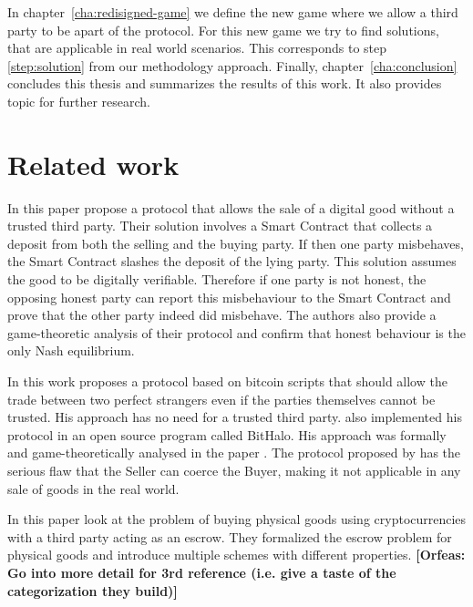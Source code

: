 \documentclass{cacthesis}
\newcommand{\authnote}[3]{{ \footnotesize \textbf{#1[#2: #3]~}}}
\newcommand{\orfnote}[1]{\authnote{\color{blue}}{Orfeas}{#1}}
\begin{document}
	In chapter~\ref{cha:redisigned-game} we define the new game where we allow a third party to be apart of the protocol. For this new game we try to find solutions, that are applicable in  real world scenarios. This corresponds to step \ref{step:solution} from our methodology approach. Finally, chapter~\ref{cha:conclusion} concludes this thesis and summarizes the results of this work. It also provides topic for further research.
\section{Related work}
In this paper \citeauthor{asgaonkar_solving_2019} propose a protocol that allows the sale of a digital good without a trusted third party. Their solution involves a Smart Contract that collects a deposit from both the selling and the buying party. If then one party misbehaves, the Smart Contract slashes the deposit of the lying party.  This solution assumes the good to be digitally verifiable. Therefore if one party is not honest, the opposing honest party can report this misbehaviour to the Smart Contract and prove that the other party indeed did misbehave. The authors also provide a game-theoretic analysis of their protocol and confirm that honest behaviour is the only Nash equilibrium.\newline

In this work \citeauthor{zimbeck_two_nodate} proposes a protocol based on bitcoin scripts that should allow the trade between two perfect strangers even if the parties themselves cannot be trusted. His approach has no need for a trusted third party. \citeauthor{zimbeck_two_nodate} also implemented his protocol in an open source program called BitHalo. His approach was formally and game-theoretically analysed in the paper \cite{bodei_validation_2015}. The protocol proposed by \citeauthor{zimbeck_two_nodate} has the serious flaw that the Seller can coerce the Buyer\cite{goharshady_irrationality_2021}, making it not applicable in any sale of goods in the real world.\newline

In this paper \citeauthor{kiayias_escrow_2017} look at the problem of buying physical goods using cryptocurrencies with a third party acting as an escrow. They formalized the escrow problem for physical goods and introduce multiple schemes with different properties.\orfnote{Go into more detail for 3rd reference (i.e. give a taste of the categorization they build)}\newline
\end{document}
